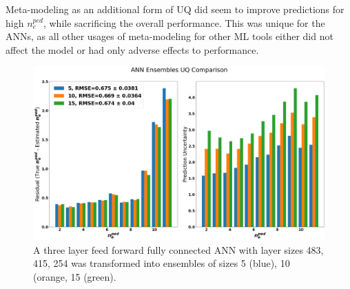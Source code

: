 \documentclass[a4paper, twoside, final, 12pt]{article}
\begin{document}
{Meta-modeling as an additional form of UQ did seem to improve predictions for high $n_e^{ped}$, while sacrificing the overall performance.
This was unique for the ANNs, as all other usages of meta-modeling for other ML tools either did not affect the model or had only adverse effects to performance.
\begin{figure}
	\centering
	\includegraphics[scale=0.25]{./src/ANN_ensemble_comp}
	\caption{A three layer feed forward fully connected ANN with layer sizes 483, 415, 254 was transformed into ensembles of sizes 5 (blue), 10 (orange, 15 (green). }
	\label{fig:ANN_UQ}
\end{figure}
}
\end{document}
